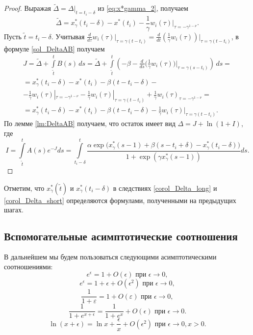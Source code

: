 %
\begin{proof}
	Выражая $\tilde{\Delta} = \Delta|_{t = t_i - \delta}$ из \eqref{eq:x*gamma_2}, получаем
\[
	\tilde{\Delta} = x^*_{\gamma}(t_i - \delta) - x^*(t_i) - \frac{1}{\gamma} w_i(\tau)|_{\tau = -\gamma^{1-\nu}}.
\]
Пусть $\tilde{t} = t_i - \delta$. Учитывая $\frac{d}{d\tau} w_i(\tau)|_{\tau = \gamma(t - t_i)} = \frac{d}{dt} \left(\frac{1}{\gamma}w_i(\tau)\right)\Big|_{\tau = \gamma(t - t_i)}$, в формуле \eqref{sol_DeltaAB} получаем
\begin{multline*}
	J = \tilde{\Delta} + \int\limits_{\tilde{t}}^{t} B(s)\,ds = \tilde{\Delta} + \int\limits_{\tilde{t}}^{t}\left(-\beta - \frac{d}{ds} \bigg(\frac{1}{\gamma}w_i(\tau)\bigg)\Big|_{\tau = \gamma(s - t_i)}\right) \,ds =\\= x^*_{\gamma}(t_i - \delta) - x^*(t_i) - \beta(t - t_i - \delta) - \\ - \frac{1}{\gamma} w_i(\tau)|_{\tau = -\gamma^{1-\nu}} - \frac{1}{\gamma}w_i(\tau)|_{\tau = \gamma(t - t_i)} + \frac{1}{\gamma}w_i(\tau)_{\tau = -\gamma^{1 - \nu}} = \\
	= x^*_{\gamma}(t_i - \delta) - x^*(t_i) - \beta(t - t_i - \delta) - \frac{1}{\gamma} w_i(\tau)|_{\tau = \gamma(t - t_i)}.
\end{multline*}
%
По лемме \ref{lm:DeltaAB} получаем, что остаток имеет вид $\Delta = J + \ln(1 + I)$, где 
\[
I = \int\limits_{\tilde{t}}^{t}A(s) e^{-J} ds = \int\limits_{t_i-\delta}^{t}\frac{\alpha\exp\big(x_{\gamma}^*(s-1)+\beta(s-t_i+\delta)-x_{\gamma}^*(t_i-\delta)\big)}{1+\exp(\gamma x_{\gamma}^*(s-1))}ds.
\]
\end{proof}
%
Отметим, что $x_{\gamma}^*(\tilde{t})$ и $x_{\gamma}^*(t_i-\delta)$ в следствиях \ref{corol_Delta_long} и \ref{corol_Delta_short} определяются формулами, полученными на предыдущих шагах.

\subsection{Вспомогательные асимптотические соотношения}

В дальнейшем мы будем пользоваться следующими асимптотическими соотношениями:
\begin{equation}
\label{eq:exp_const}
	e^{\epsilon} = 1 + O(\epsilon) \text{ при } \epsilon \to 0,
\end{equation}
\begin{equation}
\label{eq:exp_linear}
	e^{\epsilon} = 1 + \epsilon + O(\epsilon^2) \text{ при } \epsilon \to 0,
\end{equation}
\begin{equation}
\label{eq:asymp_frac}
	\frac{1}{1 + \varepsilon} = 1 + O(\varepsilon) \text{ при } \epsilon \to 0,
\end{equation}
\begin{equation}
\label{eq:exp_frac}
	\dfrac{1}{1 + e^{x + \epsilon}} = \frac{1}{1 + e^x} + O(\epsilon) \text{ при } \epsilon \to 0.
\end{equation}
\begin{equation}
\label{eq:ln_frac}
\ln(x + \epsilon) = \ln x + \frac{\epsilon}{x} + O(\epsilon^2) \text{ при } \epsilon \to 0, x > 0.
\end{equation}

